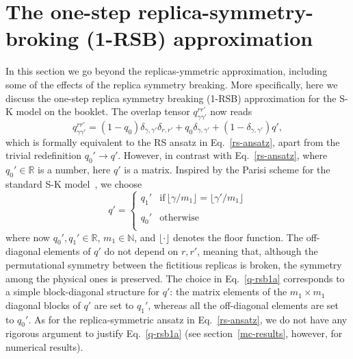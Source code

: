 \documentclass[twocolumn,superscriptaddress,prb,10pt]{revtex4-1}
\begin{document}
\section{The one-step replica-symmetry-broking (1-RSB) approximation}
\label{rsb-1-section}

In this section we go beyond the replicas-ymmetric approximation, including some 
of the effects of the replica symmetry breaking. More specifically, 
here we discuss the one-step replica symmetry breaking (1-RSB) approximation for the 
S-K model on the booklet. The overlap tensor $q_{\gamma\gamma'}^{rr'}$ now reads  
%
\begin{equation}
\label{q-rsb1}
q_{\gamma\gamma'}^{rr'}=(1-q_0)\delta_{\gamma,\gamma'}\delta_{r,r'} +
q_0\delta_{\gamma,\gamma'}+(1-\delta_{\gamma,\gamma'})q', 
\end{equation}
%
which is formally equivalent to the RS ansatz in Eq.~\eqref{rs-ansatz}, apart from 
the trivial redefinition $q_0'\to q'$. However, in contrast with Eq.~\eqref{rs-ansatz}, 
where $q_0'\in\mathbb{R}$ is a number, here $q'$ is a matrix. Inspired by the Parisi 
scheme for the standard S-K model~\cite{parisi-1979}, we choose 
%
\begin{equation}
q'=\left\{
\begin{array}{cc}
q_1' & \textrm{if}\, \lfloor\gamma/m_1\rfloor=\lfloor\gamma'/m_1\rfloor\\\\
q_0' & \textrm{otherwise}\\
\end{array}
\right.
\label{q-rsb1a}
\end{equation}
%
where now $q_0',q_1'\in{\mathbb R}$, $m_1\in{\mathbb N}$, and $\lfloor\cdot\rfloor$ 
denotes the floor function. The off-diagonal elements of $q'$ do not depend on 
$r,r'$, meaning that, although the permutational symmetry between the 
fictitious replicas is broken, the symmetry among the physical ones is preserved. 
The choice in Eq.~\eqref{q-rsb1a} corresponds to a simple block-diagonal structure for 
$q'$: the matrix elements of the $m_1\times m_1$ diagonal blocks of $q'$ are set to 
$q_1'$, whereas all the off-diagonal elements are set to $q_0'$. As for the replica-symmetric 
ansatz in Eq.~\eqref{rs-ansatz}, we do not have any rigorous argument to justify 
Eq.~\eqref{q-rsb1a} (see section~\eqref{mc-results}, however, for numerical results).
\end{document}
